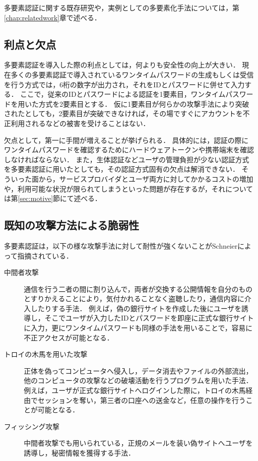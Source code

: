 多要素認証に関する既存研究や，実例としての多要素化手法については，第\ref{chap:relatedwork}章で述べる．

\subsection{利点と欠点}
多要素認証を導入した際の利点としては，何よりも安全性の向上が大きい．
現在多くの多要素認証で導入されているワンタイムパスワードの生成もしくは受信を行う方式では，6桁の数字が出力され，それをIDとパスワードに併せて入力する．
ここで，従来のIDとパスワードによる認証を1要素目，ワンタイムパスワードを用いた方式を2要素目とする．
仮に1要素目が何らかの攻撃手法により突破されたとしても，2要素目が突破できなければ，その場ですぐにアカウントを不正利用されるなどの被害を受けることはない．


欠点として，第一に手間が増えることが挙げられる．
具体的には，認証の際にワンタイムパスワードを確認するためにハードウェアトークンや携帯端末を確認しなければならない．
また，生体認証などユーザの管理負担が少ない認証方式を多要素認証に用いたとしても，その認証方式固有の欠点は解消できない．
そういった面から，サービスプロバイダとユーザ両方に対してかかるコストの増加や，利用可能な状況が限られてしまうといった問題が存在するが，それについては第\ref{sec:motive}節にて述べる．

\subsection{既知の攻撃方法による脆弱性}
多要素認証は，以下の様な攻撃手法に対して耐性が強くないことがSchneier\cite{Schneier:2005:TAT:1053291.1053327}によって指摘されている．
\begin{description}
  \item[中間者攻撃]
    通信を行う二者の間に割り込んで，両者が交換する公開情報を自分のものとすりかえることにより，気付かれることなく盗聴したり，通信内容に介入したりする手法．
    例えば，偽の銀行サイトを作成した後にユーザを誘導し，そこでユーザが入力したIDとパスワードを即座に正式な銀行サイトに入力，更にワンタイムパスワードも同様の手法を用いることで，容易に不正アクセスが可能となる．
  \item[トロイの木馬を用いた攻撃]
    正体を偽ってコンピュータへ侵入し，データ消去やファイルの外部流出，他のコンピュータの攻撃などの破壊活動を行うプログラムを用いた手法．
    例えば，ユーザが正式な銀行サイトへログインした際に，トロイの木馬経由でセッションを奪い，第三者の口座への送金など，任意の操作を行うことが可能となる．
  \item[フィッシング攻撃]
    中間者攻撃でも用いられている，正規のメールを装い偽サイトへユーザを誘導し，秘密情報を獲得する手法．
\end{description}

